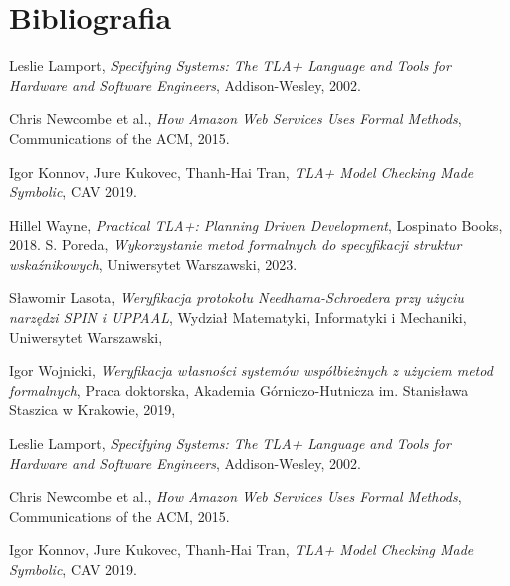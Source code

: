 \documentclass[conference]{IEEEtran}
\begin{document}
    \section{Bibliografia}
        \begin{thebibliography}{00}
            Leslie Lamport, \emph{Specifying Systems: The TLA+ Language and Tools for Hardware and Software Engineers}, Addison-Wesley, 2002.
          
            Chris Newcombe et al., \emph{How Amazon Web Services Uses Formal Methods}, Communications of the ACM, 2015.
          
            Igor Konnov, Jure Kukovec, Thanh-Hai Tran, \emph{TLA+ Model Checking Made Symbolic}, CAV 2019.
          
            Hillel Wayne, \emph{Practical TLA+: Planning Driven Development}, Lospinato Books, 2018.
            S. Poreda,
            \textit{Wykorzystanie metod formalnych do specyfikacji struktur wskaźnikowych},
            Uniwersytet Warszawski, 2023.
        
            Sławomir Lasota,
            \textit{Weryfikacja protokołu Needhama-Schroedera przy użyciu narzędzi SPIN i UPPAAL},
            Wydział Matematyki, Informatyki i Mechaniki, Uniwersytet Warszawski,
        
            Igor Wojnicki,
            \textit{Weryfikacja własności systemów współbieżnych z użyciem metod formalnych},
            Praca doktorska, Akademia Górniczo-Hutnicza im. Stanisława Staszica w Krakowie, 2019,

            Leslie Lamport, \emph{Specifying Systems: The TLA+ Language and Tools for Hardware and Software Engineers}, Addison-Wesley, 2002.
        
            Chris Newcombe et al., \emph{How Amazon Web Services Uses Formal Methods}, Communications of the ACM, 2015.
        
            Igor Konnov, Jure Kukovec, Thanh-Hai Tran, \emph{TLA+ Model Checking Made Symbolic}, CAV 2019.
        

\end{thebibliography}
\end{document}
